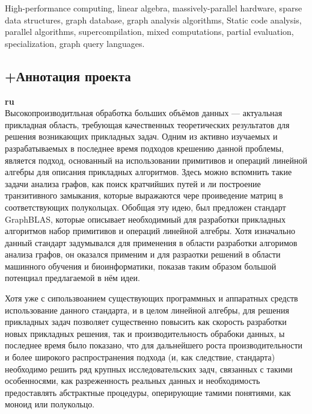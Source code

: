 \documentclass[12pt]{article}  %
\theoremstyle{remark}
\begin{document}
High-performance computing, linear algebra, massively-parallel hardware, sparse data structures, graph database, graph analysis algorithms, Static code analysis, parallel algorithms, supercompilation, mixed computations, partial evaluation, specialization, graph query languages.



\subsection{+Аннотация проекта}
\textbf{ru}\\

Высокопроизводитльная обработка больших объёмов данных — актуальная прикладная область, требующая качественных теоретических результатов для решения возникающих прикладных задач. Одним из активно изучаемых и разрабатываемых в последнее время подходов крешению данной проблемы, является подход, основанный на использовании примитивов и операций линейной алгебры для описания прикладных алгоритмов. Здесь можно вспомнить такие задачи анализа графов, как поиск кратчийших путей и ли построение транзитивного замыкания, которые выражаются чере проиведение матриц в соответствующих полукольцах. Обобщая эту идею, был предложен стандарт GraphBLAS, которые описывает необходимиый для разработки прикладных алгоритмов набор примитивов и операций линейной алгебры. Хотя изначально данный стандарт задумывался для применения в области разработки алгоримов анализа графов, он оказался применим и для разраотки решений в области машинного обучения и биоинформатики, показав таким образом большой потенциал предлагаемой в нём идеи.

Хотя уже с сипользвоанием существующих программных и аппаратных средств использование данного стандарта, и в целом линейной алгебры, для решения прикладных задач позволяет существенно повысить как скорость разработки новых прикладных решения, так и производительность обрабоки данных, ы последнее время было показано, что для дальнейшего роста производительности и более широкого распространения подхода (и, как следствие, стандарта) необходимо решить ряд крупных исследовательских задч, связанных с такими особенносями, как разреженность реальных данных и необходимость предоставлять абстрактные процедуры, оперирующие тамими понятиями, как моноид или полукольцо.
\end{document}
